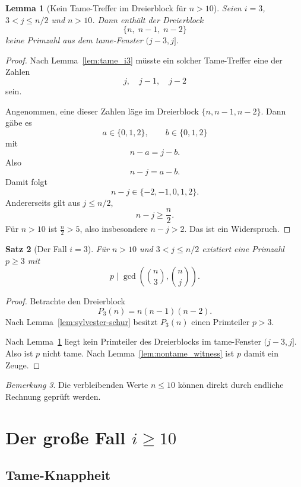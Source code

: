 \documentclass[12pt,a4paper]{article}
\theoremstyle{plain}
\newtheorem{theorem}{Satz}[section]
\newtheorem{lemma}[theorem]{Lemma}
\theoremstyle{definition}
\theoremstyle{remark}
\newtheorem{remark}[theorem]{Bemerkung}
\begin{document}
	\begin{lemma}[Kein Tame-Treffer im Dreierblock für \(n>10\)]
		\label{lem:no_tame_hit_i3}
		Seien \(i=3\), \(3<j\le n/2\) und \(n>10\). Dann enthält der Dreierblock
		\[
		\{n,\;n-1,\;n-2\}
		\]
		keine Primzahl aus dem tame-Fenster \((j-3,j]\).
	\end{lemma}
	
	\begin{proof}
		Nach Lemma~\ref{lem:tame_i3} müsste ein solcher Tame-Treffer eine der Zahlen
		\[
		j,\quad j-1,\quad j-2
		\]
		sein.
		
		Angenommen, eine dieser Zahlen läge im Dreierblock \(\{n,n-1,n-2\}\). Dann gäbe es
		\[
		a\in\{0,1,2\},\qquad b\in\{0,1,2\}
		\]
		mit
		\[
		n-a=j-b.
		\]
		Also
		\[
		n-j=a-b.
		\]
		Damit folgt
		\[
		n-j\in\{-2,-1,0,1,2\}.
		\]
		Andererseits gilt aus \(j\le n/2\),
		\[
		n-j\ge \frac n2.
		\]
		Für \(n>10\) ist \(\frac n2>5\), also insbesondere \(n-j>2\). Das ist ein Widerspruch.
	\end{proof}
	
	\begin{theorem}[Der Fall \(i=3\)]
		\label{thm:i3_final}
		Für \(n>10\) und \(3<j\le n/2\) existiert eine Primzahl \(p\ge3\) mit
		\[
		p\mid \gcd\!\left(\binom n3,\binom nj\right).
		\]
	\end{theorem}
	
	\begin{proof}
		Betrachte den Dreierblock
		\[
		P_3(n)=n(n-1)(n-2).
		\]
		Nach Lemma~\ref{lem:sylvester-schur} besitzt \(P_3(n)\) einen Primteiler \(p>3\).
		
		Nach Lemma~\ref{lem:no_tame_hit_i3} liegt kein Primteiler des Dreierblocks im tame-Fenster
		\((j-3,j]\). Also ist \(p\) nicht tame. Nach Lemma~\ref{lem:nontame_witness} ist \(p\)
		damit ein Zeuge.
	\end{proof}
	
	\begin{remark}
		Die verbleibenden Werte \(n\le10\) können direkt durch endliche Rechnung geprüft werden.
	\end{remark}
	
	\section{Der große Fall \(i\ge10\)}
	
	\subsection{Tame-Knappheit}
	
\end{document}
